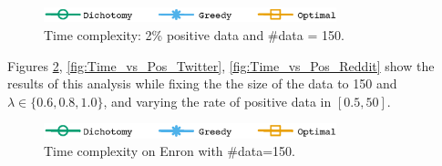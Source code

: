 \begin{figure}[H]
\begin{centering}
\includegraphics[width=8.5cm]{imgs/legend2}
\par\end{centering}
\begin{centering}
\par\end{centering}
\caption{Time complexity: 2\% positive data and  \#data = 150.}
\label{fig:Time_vs_Lambda}
\end{figure}

 Figures \ref{fig:Time_vs_Pos_Enron}, \ref{fig:Time_vs_Pos_Twitter}, \ref{fig:Time_vs_Pos_Reddit} show the results of this analysis while fixing the  the size of the data to 150 and $\lambda\in \{0.6,0.8,1.0\}$, and varying the rate of positive data in $[0.5,50]$.

\begin{figure}[H]
\begin{centering}
\includegraphics[width=8.5cm]{imgs/legend2}
\par\end{centering}
\begin{centering}
\par\end{centering}
\caption{Time complexity on Enron with \#data=150.}
\label{fig:Time_vs_Pos_Enron}
\end{figure}


